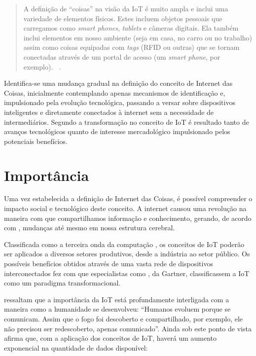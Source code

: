 \documentclass[twoside,english,brazilian]{UNISINOSmonografia}
\begin{document}
	\begin{quote}
		A definição de ``coisas'' na visão da IoT é muito ampla e inclui 
		uma variedade de elementos físicos. Estes incluem objetos pessoais 
		que carregamos como \textit{smart phones}, \textit{tablets} e 
		câmeras digitais. Ela também inclui elementos em nosso ambiente 
		(seja em casa, no carro ou no trabalho) assim como coisas 
		equipadas com \textit{tags} (RFID ou outras) que se tornam 
		conectadas através de um portal de acesso (um \textit{smart 
			phone}, por exemplo).~
		\cite{Coetzee2011}.
	\end{quote}
	
	Identifica-se uma mudança gradual na definição do conceito de Internet 
	das Coisas, inicialmente contemplando apenas mecanismos de 
	identificação e, impulsionado pela evolução tecnológica, passando a 
	versar sobre dispositivos inteligentes e diretamente conectados à 
	internet sem a necessidade de intermediários. Segundo 
	 a transformação no conceito de IoT é resultado 
	tanto de avanços tecnológicos quanto de interesse mercadológico 
	impulsionado pelos potenciais benefícios.


\section{Importância}

	Uma vez estabelecida a definição de Internet das Coisas, é possível 
	compreender o impacto social e tecnológico deste conceito. A internet 
	causou uma revolução na maneira com que compartilhamos informação e 
	conhecimento, gerando, de acordo com , mudanças 
	até mesmo em nossa estrutura cerebral.
	
	Classificada como a terceira onda da computação \cite{Register2013}, 
	os conceitos de IoT poderão ser aplicados a diversos setores 
	produtivos, desde a indústria ao setor público. Os possíveis 
	benefícios obtidos através de uma vasta rede de dispositivos 
	interconectados fez com que especialistas como , 
	da Gartner, classificassem a IoT como um paradigma transformacional.
	
	 ressaltam que a importância da IoT está 
	profundamente interligada com a maneira como a humanidade se desenvolveu: 
	``Humanos evoluem porque se comunicam. Assim que o fogo foi descoberto 
	e compartilhado, por exemplo, ele não precisou ser redescoberto, 
	apenas comunicado''. Ainda sob este ponto de vista afirma que, com a 
	aplicação dos conceitos de IoT, haverá um aumento exponencial na 
	quantidade de dados disponível:
	
\end{document}
